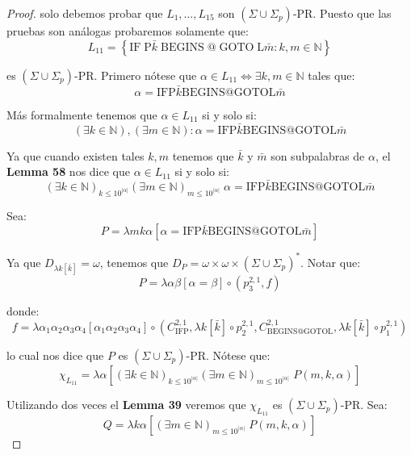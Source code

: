 \begin{proof}
    \PN solo debemos probar que $L_{1}, \dotsc, L_{15}$ son $(\Sigma \cup \Sigma_{p})$-PR. Puesto que las pruebas son
    análogas probaremos solamente que:
    \[
      L_{11} = \left\{\mathrm{IF}\;\mathrm{P}\bar{k}\;\mathrm{BEGINS}\;@\;\mathrm{GOTO}\;\mathrm{L}\bar{m}: k,m \in
      \mathbb{N}\right\}
    \]

    \PN es $(\Sigma \cup \Sigma_{p})$-PR. Primero nótese que $\alpha \in L_{11} \Leftrightarrow \exists k, m \in
    \mathbb{N}$ tales que:
    \[
      \alpha = \mathrm{IFP}\bar{k}\mathrm{BEGINS}@\mathrm{GOTOL}\bar{m}
    \]

    \PN Más formalmente tenemos que $\alpha \in L_{11}$ si y solo si:
    \[
      (\exists k \in \mathbb{N}), (\exists m \in \mathbb{N}): \alpha = \mathrm{IFP}\bar{k}\mathrm{BEGINS}@
      \mathrm{GOTOL}\bar{m}
    \]

    \PN Ya que cuando existen tales $k, m$ tenemos que $\bar{k}$ y $\bar{m}$ son subpalabras de $\alpha$, el
    \textbf{Lemma 58} nos dice que $\alpha \in L_{11}$ si y solo si:
    \[
      (\exists k \in \mathbb{N})_{k\leq 10^{\lvert \alpha \rvert}}(\exists m \in \mathbb{N})_{m \leq
      10^{\lvert \alpha \rvert}} \; \alpha = \mathrm{IFP}\bar{k}\mathrm{BEGINS}@\mathrm{GOTOL}\bar{m}
    \]

    \PN Sea:
    \[
      P = \lambda mk\alpha \left[\alpha =\mathrm{IFP}\bar{k}\mathrm{BEGINS}@\mathrm{GOTOL}\bar{m}\right]
    \]

    \PN Ya que $D_{\lambda k \left[\bar{k}\right]} = \omega$, tenemos que $D_{P} = \omega \times \omega \times
    (\Sigma \cup \Sigma_{p})^{\ast}$. Notar que:
    \[
      P = \lambda \alpha\beta \left[\alpha =\beta\right] \circ \left(p_{3}^{2,1},f\right)
    \]

    \PN donde:
    \[
      f = \lambda \alpha_{1}\alpha_{2}\alpha_{3}\alpha_{4}\left[\alpha_{1}\alpha_{2}\alpha_{3}\alpha_{4}\right] \circ
      \left(C_{\mathrm{IFP}}^{2,1},\lambda k \left[\bar{k}\right] \circ p_{2}^{2,1},C_{\mathrm{BEGINS}@
      \mathrm{GOTOL}}^{2,1},\lambda k \left[\bar{k}\right] \circ p_{1}^{2,1}\right)
    \]

    \PN lo cual nos dice que $P$ es $(\Sigma \cup \Sigma_{p})$-PR.
    \PN Nótese que:
    \[
      \chi_{L_{11}} = \lambda \alpha \left[(\exists k \in \mathbb{N})_{k\leq 10^{\lvert \alpha \rvert}}(\exists
      m \in \mathbb{N})_{m\leq 10^{\lvert \alpha \rvert}} \; P(m,k,\alpha)\right]
    \]

    \PN Utilizando dos veces el \textbf{Lemma 39} veremos que $\chi_{L_{11}}$ es $(\Sigma \cup \Sigma_{p})$-PR. Sea:
    \[
      Q = \lambda k\alpha \left[(\exists m \in \mathbb{N})_{m\leq 10^{\lvert \alpha \rvert}}\; P(m,k,\alpha)
      \right]
    \]


\end{proof}

